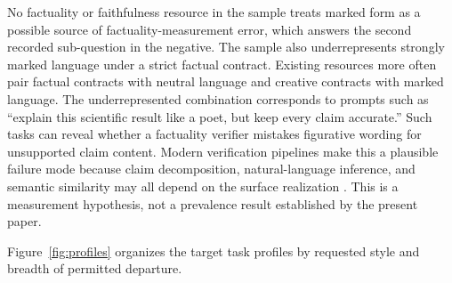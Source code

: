 \documentclass{clv2025}
\begin{document}
No factuality or faithfulness resource in the sample treats marked form as a possible source of factuality-measurement error, which answers the second recorded sub-question in the negative.
The sample also underrepresents strongly marked language under a strict factual contract.
Existing resources more often pair factual contracts with neutral language and creative contracts with marked language.
The underrepresented combination corresponds to prompts such as ``explain this scientific result like a poet, but keep every claim accurate.''
Such tasks can reveal whether a factuality verifier mistakes figurative wording for unsupported claim content.
Modern verification pipelines make this a plausible failure mode because claim decomposition, natural-language inference, and semantic similarity may all depend on the surface realization \citep{chen_menli_2023,aynetdinov_semscore_2024}.
This is a measurement hypothesis, not a prevalence result established by the present paper.

Figure~\ref{fig:profiles} organizes the target task profiles by requested style and breadth of permitted departure.
\end{document}
